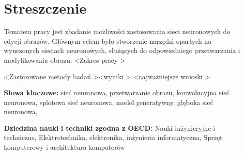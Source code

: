 \section*{Streszczenie}

  Tematem pracy jest zbadanie możliwości zastosowania sieci neuronowych do
  edycji obrazów. Głównym celem było stworzenie narzędzi opartych na wyuczonych
  sieciach neuronowych, służących do odpowiedniego przetwarzania i
  modyfikowania obrazu. \textless Zakres pracy \textgreater

  \textless Zastosowane metody badań \textgreater \textless wyniki \textgreater
  \textless najważniejsze wnioski \textgreater

  \bigskip

  \noindent\textbf{Słowa kluczowe:} sieć neuronowa, przetwarzanie obrazu,
  konwolucyjna sieć neuronowa, splotowa sieć neuronowa, model generatywny,
  głęboka sieć neuronowa, 

  \bigskip

  \noindent\textbf{Dziedzina nauki i techniki zgodna z OECD:} Nauki
  inżynieryjne i techniczne, Elektrotechnika, elektronika, inżynieria
  informatyczna, Sprzęt komputerowy i architektura komputerów
